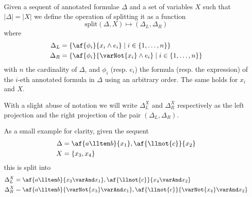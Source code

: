 \begin{define}[Splitting]
	\label{def:split}
	Given a sequent of annotated formulae $\Delta$ and a set of variables $X$ such that $|\Delta| = |X|$ we define the operation of splitting it as a function
	$$ \mathrm{split}(\Delta, X) \mapsto (\Delta_L, \Delta_R) $$
	where
	\begin{align*}
		\Delta_L &= \{ \af{\phi_i}{x_i \wedge e_i} \mid i \in \{1, \dots, n\}\} \\
		\Delta_R &= \{ \af{\phi_i}{\varNot{x_i} \wedge e_i} \mid i \in \{1, \dots, n\}\}
	\end{align*}
	with $n$ the cardinality of $\Delta$, and $\phi_i$ (resp. $e_i$) the formula (resp. the expression) of the $i$-eth annotated formula in $\Delta$ using an arbitrary order.
	The same holds for $x_i$ and $X$.

	\noindent With a slight abuse of notation we will write $\Delta_L^X$ and $\Delta_R^X$ respectively as the left projection and the right projection of the pair $(\Delta_L, \Delta_R)$.
\end{define}
As a small example for clarity, given the sequent
\begin{align*}
	\Delta &= \af{a \llten b}{x_1}, \af{\llnot{c}}{x_2} \\
	X      &= \{ x_3, x_4 \} 
\end{align*}
this is split into
\begin{align*}
	\Delta_L^X &= \af{a \llten b}{x_3 \varAnd x_1}, \af{\llnot{c}}{x_4 \varAnd x_2} \\
	\Delta_R^X &= \af{a \llten b}{\varNot{x_3} \varAnd x_1}, \af{\llnot{c}}{\varNot{x_4} \varAnd x_2} 
\end{align*}


